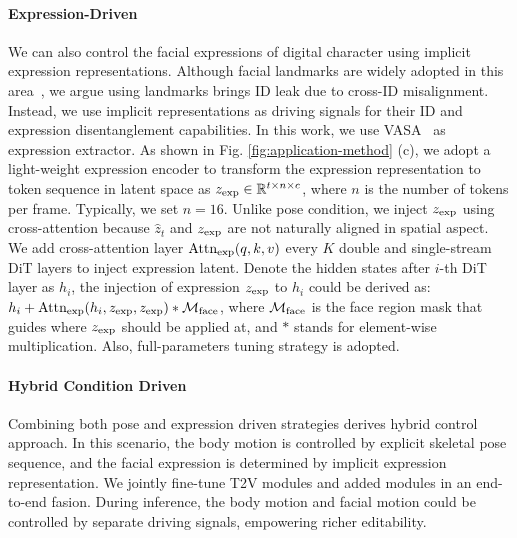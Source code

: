 \paragraph{Expression-Driven}
We can also control the facial expressions of digital character using implicit expression representations. Although facial landmarks are widely adopted in this area~\cite{ma2024follow, chen2024echomimic}, we argue using landmarks brings ID leak due to cross-ID misalignment. Instead, we use implicit representations as driving signals for their ID and expression disentanglement capabilities. In this work, we use VASA~\cite{xu2024vasa} as expression extractor. As shown in Fig. \ref{fig:application-method} (c), we adopt a light-weight expression encoder to transform the expression representation to token sequence in latent space as $z_{\rm exp} \in \mathbb{R}^{t \times n \times c}$, where $n$ is the number of tokens per frame. Typically, we set $n = 16$. Unlike pose condition, we inject $z_{\rm exp}$ using cross-attention because $\hat{z}_t$ and $z_{\rm exp}$ are not naturally aligned in spatial aspect. We add cross-attention layer ${\rm Attn_{exp}}(q,k,v)$ every $K$ double and single-stream DiT layers to inject expression latent. Denote the hidden states after $i$-th DiT layer as $h_{i}$, the injection of expression $z_{\rm exp}$ to $h_{i}$ could be derived as: $h_{i} + {\rm Attn_{exp}} (h_i, z_{\rm exp}, z_{\rm exp}) \ast \mathcal{M}_{\rm face}$, where $\mathcal{M}_{\rm face}$ is the face region mask that guides where $z_{\rm exp}$ should be applied at, and $\ast$ stands for element-wise multiplication. Also, full-parameters tuning strategy is adopted.


\paragraph{Hybrid Condition Driven}
Combining both pose and expression driven strategies derives hybrid control approach. In this scenario, the body motion is controlled by explicit skeletal pose sequence, and the facial expression is determined by implicit expression representation. We jointly fine-tune T2V modules and added modules in an end-to-end fasion. During inference, the body motion and facial motion could be controlled by separate driving signals, empowering richer editability. 